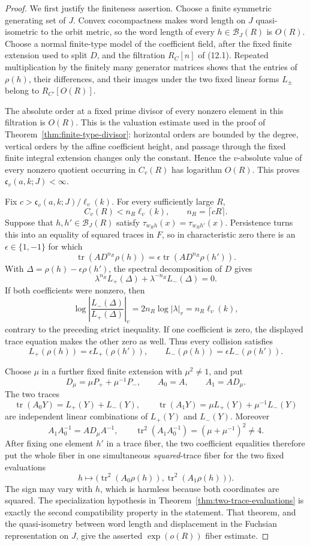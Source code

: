 \documentclass[11pt,reqno]{amsart}
\theoremstyle{definition}
\theoremstyle{remark}
\newcommand{\Tr}{\operatorname{tr}}
\begin{document}
\begin{proof}
We first justify the finiteness assertion.  Choose a finite symmetric
generating set of \(J\).  Convex cocompactness makes word length on \(J\)
quasi-isometric to the orbit metric, so the word length of every
\(h\in\mathcal B_J(R)\) is \(O(R)\).  Choose a normal finite-type model
of the coefficient field, after the fixed finite extension used to split
\(D\), and the filtration \(R_C[n]\) of (12.1).  Repeated multiplication
by the finitely many generator matrices shows that the entries of
\(\rho(h)\), their differences, and their images under the two fixed
linear forms \(L_\pm\) belong to \(R_{C'}[O(R)]\).

The absolute order at a fixed prime divisor of every nonzero element in
this filtration is \(O(R)\).  This is the valuation estimate used in the
proof of Theorem~\ref{thm:finite-type-divisor}: horizontal orders are
bounded by the degree, vertical orders by the affine coefficient height,
and passage through the fixed finite integral extension changes only the
constant.  Hence the \(v\)-absolute value of every nonzero quotient
occurring in \(C_v(R)\) has logarithm \(O(R)\).  This proves
\(\mathfrak c_v(a,k;J)<\infty\).

Fix \(c>\mathfrak c_v(a,k;J)/\ell_v(k)\).  For every sufficiently large
\(R\),
\[
 C_v(R)<n_R\ell_v(k),\qquad n_R=\lceil cR\rceil.
\]
Suppose that \(h,h'\in\mathcal B_J(R)\) satisfy
\(\tau_{w_Rh}(x)=\tau_{w_Rh'}(x)\).  Persistence turns this into an
equality of squared traces in \(F\), so in characteristic zero there is
an \(\epsilon\in\{1,-1\}\) for which
\[
 \Tr(AD^{n_R}\rho(h))
   =\epsilon\Tr(AD^{n_R}\rho(h')).
\]
With \(\Delta=\rho(h)-\epsilon\rho(h')\), the spectral decomposition of
\(D\) gives
\[
 \lambda^{n_R}L_+(\Delta)
   +\lambda^{-n_R}L_-(\Delta)=0.
\]
If both coefficients were nonzero, then
\[
 \log\left|\frac{L_-(\Delta)}{L_+(\Delta)}\right|_v
 =2n_R\log|\lambda|_v=n_R\ell_v(k),
\]
contrary to the preceding strict inequality.  If one coefficient is zero,
the displayed trace equation makes the other zero as well.  Thus every
collision satisfies
\[
 L_+(\rho(h))=\epsilon L_+(\rho(h')),
 \qquad
 L_-(\rho(h))=\epsilon L_-(\rho(h')).
\]

Choose \(\mu\) in a further fixed finite extension with
\(\mu^2\ne1\), and put
\[
 D_\mu=\mu P_++\mu^{-1}P_-,
 \qquad A_0=A,\qquad A_1=AD_\mu.
\]
The two traces
\[
 \Tr(A_0Y)=L_+(Y)+L_-(Y),\qquad
 \Tr(A_1Y)=\mu L_+(Y)+\mu^{-1}L_-(Y)
\]
are independent linear combinations of \(L_+(Y)\) and \(L_-(Y)\).
Moreover
\[
 A_1A_0^{-1}=AD_\mu A^{-1},\qquad
 \Tr^2(A_1A_0^{-1})=(\mu+\mu^{-1})^2\ne4.
\]
After fixing one element \(h'\) in a trace fiber, the two coefficient
equalities therefore put the whole fiber in one simultaneous
\emph{squared}-trace fiber for the two fixed evaluations
\[
 h\longmapsto
 \bigl(\Tr^2(A_0\rho(h)),\Tr^2(A_1\rho(h))\bigr).
\]
The sign may vary with \(h\), which is harmless because both coordinates
are squared.  The specialization hypothesis in
Theorem~\ref{thm:two-trace-evaluations} is exactly the second compatibility
property in the statement.  That theorem, and the quasi-isometry between
word length and displacement in the Fuchsian representation on \(J\), give the asserted
\(\exp(o(R))\) fiber estimate.


\end{proof}
\end{document}
